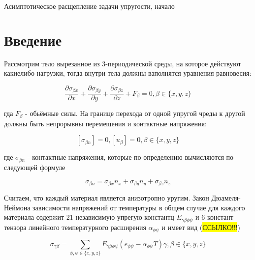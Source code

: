 \begin{center}
    \Huge{Асимптотическое расщепление задачи упругости, начало}
\end{center}

\section{Введение}

Рассмотрим тело вырезанное из 3-периодической среды, на которое действуют какиелибо нагрузки, тогда внутри тела должны ваполнятся уравнения
равновесия:

\begin{equation}
    \label{elhp:eq1}
    \frac{\partial \sigma_{\beta x}}{\partial x} +
    \frac{\partial \sigma_{\beta y}}{\partial y} +
    \frac{\partial \sigma_{\beta z}}{\partial z} +
    F_{\beta} = 0,
    \beta \in \{x,y,z\} 
\end{equation}

гда 
$F_{\beta}$ 
- обьёмные силы. На границе перехода от одной упругой чреды к другой должны быть непрорывны перемещения и контактные напряжения:

\begin{equation}
    \label{elhp:eq2}
    \left[ \sigma_{\beta n} \right] = 0, \left[ u_{\beta} \right] = 0, \beta \in \{x,y,z\} 
\end{equation}

где $\sigma_{\beta n}$ -  контактные напряжения, которые по определению вычисляются по следующей формуле

\begin{equation}
    \label{elhp:eq3}
    \sigma_{\beta n} = 
    \sigma_{\beta x} n_x +
    \sigma_{\beta y} n_y +
    \sigma_{\beta z} n_z
\end{equation}

Считаем, что каждый материал является анизотропно уругим. Закон Дюамеля-Неймона зависимости напряжений от температуры в общем случае для
каждого материала содержит 21 независимую упрегую константц 
$E_{\gamma\beta\phi\psi}$ 
и 6 констант тензора линейного температурного 
расширения 
$\alpha_{\phi\psi}$ 
и имеет вид (\colorbox{yellow}{ССЫЛКО!!!})

\begin{equation}
    \label{elhp:eq4}
    \sigma_{\gamma \beta} = \sum_{ \phi, \psi \in \{x,y,z\} } E_{\gamma\beta\phi\psi} 
    \left( e_{\phi\psi} - \alpha_{\phi\psi}T \right) \gamma,\beta \in \{x,y,z\} 
\end{equation}

